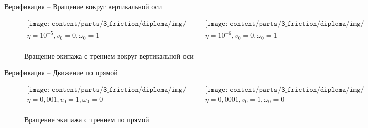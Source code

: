 \begin{frame}{Верификация -- Вращение вокруг вертикальной оси}
    \vspace{-50pt}
    \begin{figure}[h]
        \begin{center}\begin{equation*}\begin{array}{cc}
            \texttt{[image: content/parts/3\_friction/diploma/img/res/comparison\_v\_0\_0\_omega\_1\_frac\_1e-5\_n\_4\_time\_10s.png]} 
            &
            \texttt{[image: content/parts/3\_friction/diploma/img/res/comparison\_v\_0\_0\_omega\_1\_frac\_1e-6\_n\_4\_time\_10s.png]}\\
            \eta = 10^{-5}, v_0 = 0, \omega_0 = 1 & \eta = 10^{-6}, v_0 = 0, \omega_0 = 1\\
        \end{array}\end{equation*}\end{center}
        \caption{Вращение экипажа с трением вокруг вертикальной оси}
    \end{figure}
\end{frame}

\begin{frame}{Верификация -- Движение по прямой}
    \vspace{-50pt}
    \begin{figure}[h]
        \begin{center}\begin{equation*}\begin{array}{cc}
            \texttt{[image: content/parts/3\_friction/diploma/img/res/comparison\_v\_1\_0\_omega\_0\_frac\_1e-1\_n\_4\_time\_10s.png]}
            &
            \texttt{[image: content/parts/3\_friction/diploma/img/res/comparison\_v\_1\_0\_omega\_0\_frac\_1e-2\_n\_4\_time\_10s.png]}\\
            \eta = 0,001, v_0 = 1, \omega_0 = 0 & \eta = 0,0001, v_0 = 1, \omega_0 = 0\\
        \end{array}\end{equation*}\end{center}
        \caption{Вращение экипажа с трением по прямой}
    \end{figure}
\end{frame}

